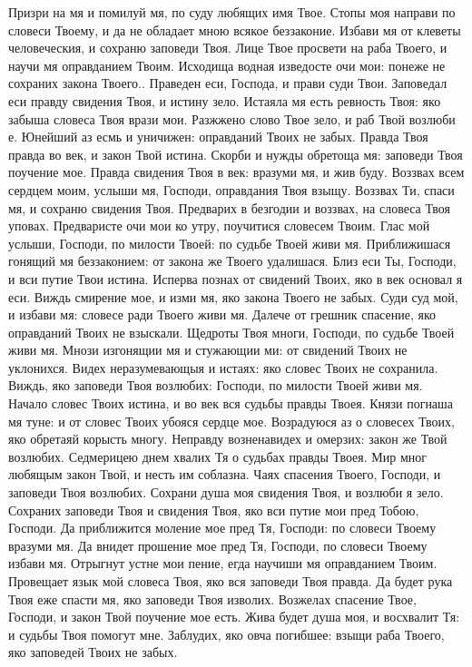 Призри на мя и помилуй мя, по суду любящих имя Твое. Стопы моя направи по словеси Твоему, и да не обладает мною всякое беззаконие. Избави мя от клеветы человеческия, и сохраню заповеди Твоя. Лице Твое просвети на раба Твоего, и научи мя оправданием Твоим. Исходища водная изведосте очи мои: понеже не сохраних закона Твоего.. Праведен еси, Господа, и прави суди Твои. Заповедал еси правду свидения Твоя, и истину зело. Истаяла мя есть ревность Твоя: яко забыша словеса Твоя врази мои. Разжжено слово Твое зело, и раб Твой возлюби е. Юнейший аз есмь и уничижен: оправданий Твоих не забых. Правда Твоя правда во век, и закон Твой истина. Скорби и нужды обретоща мя: заповеди Твоя поучение мое. Правда свидения Твоя в век: вразуми мя, и жив буду. Воззвах всем сердцем моим, услыши мя, Господи, оправдания Твоя взыщу. Воззвах Ти, спаси мя, и сохраню свидения Твоя. Предварих в безгодии и воззвах, на словеса Твоя уповах. Предваристе очи мои ко утру, поучитися словесем Твоим. Глас мой услыши, Господи, по милости Твоей: по судьбе Твоей живи мя. Приближишася гонящий мя беззаконием: от закона же Твоего удалишася. Близ еси Ты, Господи, и вси путие Твои истина. Исперва познах от свидений Твоих, яко в век основал я еси. Виждь смирение мое, и изми мя, яко закона Твоего не забых. Суди суд мой, и избави мя: словесе ради Твоего живи мя. Далече от грешник спасение, яко оправданий Твоих не взыскали. Щедроты Твоя многи, Господи, по судьбе Твоей живи мя. Мнози изгонящии мя и стужающии ми: от свидений Твоих не уклонихся. Видех неразумевающыя и истаях: яко словес Твоих не сохранила. Виждь, яко заповеди Твоя возлюбих: Господи, по милости Твоей живи мя. Начало словес Твоих истина, и во век вся судьбы правды Твоея. Князи погнаша мя туне: и от словес Твоих убояся сердце мое. Возрадуюся аз о словесех Твоих, яко обретаяй корысть многу. Неправду возненавидех и омерзих: закон же Твой возлюбих. Седмерицею днем хвалих Тя о судьбах правды Твоея. Мир мног любящым закон Твой, и несть им соблазна. Чаях спасения Твоего, Господи, и заповеди Твоя возлюбих. Сохрани душа моя свидения Твоя, и возлюби я зело. Сохраних заповеди Твоя и свидения Твоя, яко вси путие мои пред Тобою, Господи. Да приближится моление мое пред Тя, Господи: по словеси Твоему вразуми мя. Да внидет прошение мое пред Тя, Господи, по словеси Твоему избави мя. Отрыгнут устне мои пение, егда научиши мя оправданием Твоим. Провещает язык мой словеса Твоя, яко вся заповеди Твоя правда. Да будет рука Твоя еже спасти мя, яко заповеди Твоя изволих. Возжелах спасение Твое, Господи, и закон Твой поучение мое есть. Жива будет душа моя, и восхвалит Тя: и судьбы Твоя помогут мне. Заблудих, яко овча погибшее: взыщи раба Твоего, яко заповедей Твоих не забых. 

